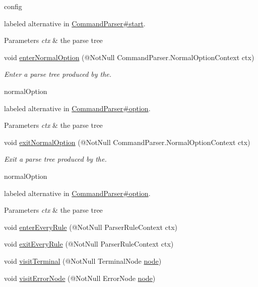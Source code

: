 \begin{DoxyCompactItemize}
\begin{DoxyCompactList}
\begin{DoxyCode}
config 
\end{DoxyCode}
 labeled alternative in \hyperlink{}{Command\+Parser\#start}. 
\begin{DoxyParams}{Parameters}
{\em ctx} & the parse tree\\
\hline
\end{DoxyParams}
 \end{DoxyCompactList}\item 
void \hyperlink{classedu_1_1udel_1_1cis_1_1vsl_1_1civl_1_1run_1_1common_1_1CommandBaseListener_a22be55f061a99854ed0429c587730c3e}{enter\+Normal\+Option} (@Not\+Null Command\+Parser.\+Normal\+Option\+Context ctx)
\begin{DoxyCompactList}\small\item\em Enter a parse tree produced by the.


\begin{DoxyCode}
normalOption 
\end{DoxyCode}
 labeled alternative in \hyperlink{}{Command\+Parser\#option}. 
\begin{DoxyParams}{Parameters}
{\em ctx} & the parse tree\\
\hline
\end{DoxyParams}
 \end{DoxyCompactList}\item 
void \hyperlink{classedu_1_1udel_1_1cis_1_1vsl_1_1civl_1_1run_1_1common_1_1CommandBaseListener_a6ea06b57316d1dbe313cf84c7d0ee8b7}{exit\+Normal\+Option} (@Not\+Null Command\+Parser.\+Normal\+Option\+Context ctx)
\begin{DoxyCompactList}\small\item\em Exit a parse tree produced by the.


\begin{DoxyCode}
normalOption 
\end{DoxyCode}
 labeled alternative in \hyperlink{}{Command\+Parser\#option}. 
\begin{DoxyParams}{Parameters}
{\em ctx} & the parse tree\\
\hline
\end{DoxyParams}
 \end{DoxyCompactList}\item 
void \hyperlink{classedu_1_1udel_1_1cis_1_1vsl_1_1civl_1_1run_1_1common_1_1CommandBaseListener_af74c6c5c223853fe0868456f1804cf29}{enter\+Every\+Rule} (@Not\+Null Parser\+Rule\+Context ctx)
\item 
void \hyperlink{classedu_1_1udel_1_1cis_1_1vsl_1_1civl_1_1run_1_1common_1_1CommandBaseListener_a4ec0875aab8c33d77de387dd7995bd65}{exit\+Every\+Rule} (@Not\+Null Parser\+Rule\+Context ctx)
\item 
void \hyperlink{classedu_1_1udel_1_1cis_1_1vsl_1_1civl_1_1run_1_1common_1_1CommandBaseListener_a4356c06c21f6e9cf3d29007853ba3c01}{visit\+Terminal} (@Not\+Null Terminal\+Node \hyperlink{structnode}{node})
\item 
void \hyperlink{classedu_1_1udel_1_1cis_1_1vsl_1_1civl_1_1run_1_1common_1_1CommandBaseListener_a4cd4779598318f82512fa9bbbd9c727c}{visit\+Error\+Node} (@Not\+Null Error\+Node \hyperlink{structnode}{node})
\end{DoxyCompactItemize}


